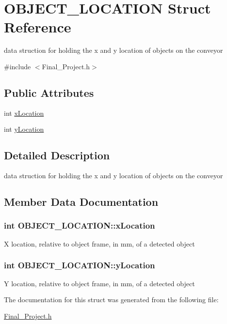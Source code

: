 \hypertarget{struct_o_b_j_e_c_t___l_o_c_a_t_i_o_n}{
\section{OBJECT\_\-LOCATION Struct Reference}
\label{struct_o_b_j_e_c_t___l_o_c_a_t_i_o_n}
}


data struction for holding the x and y location of objects on the conveyor  


{\ttfamily \#include $<$Final\_\-Project.h$>$}\subsection*{Public Attributes}
\begin{DoxyCompactItemize}
\item 
int \hyperlink{struct_o_b_j_e_c_t___l_o_c_a_t_i_o_n_a1c479191902653742eaadaef2d873592}{xLocation}
\item 
int \hyperlink{struct_o_b_j_e_c_t___l_o_c_a_t_i_o_n_a5210f032316a47c3cd0c64f40018ec76}{yLocation}
\end{DoxyCompactItemize}


\subsection{Detailed Description}
data struction for holding the x and y location of objects on the conveyor 

\subsection{Member Data Documentation}
\hypertarget{struct_o_b_j_e_c_t___l_o_c_a_t_i_o_n_a1c479191902653742eaadaef2d873592}{
\subsubsection[{xLocation}]{\setlength{\rightskip}{0pt plus 5cm}int {\bf OBJECT\_\-LOCATION::xLocation}}}
\label{struct_o_b_j_e_c_t___l_o_c_a_t_i_o_n_a1c479191902653742eaadaef2d873592}
X location, relative to object frame, in mm, of a detected object \hypertarget{struct_o_b_j_e_c_t___l_o_c_a_t_i_o_n_a5210f032316a47c3cd0c64f40018ec76}{
\subsubsection[{yLocation}]{\setlength{\rightskip}{0pt plus 5cm}int {\bf OBJECT\_\-LOCATION::yLocation}}}
\label{struct_o_b_j_e_c_t___l_o_c_a_t_i_o_n_a5210f032316a47c3cd0c64f40018ec76}
Y location, relative to object frame, in mm, of a detected object 

The documentation for this struct was generated from the following file:\begin{DoxyCompactItemize}
\item 
\hyperlink{_final___project_8h}{Final\_\-Project.h}\end{DoxyCompactItemize}
